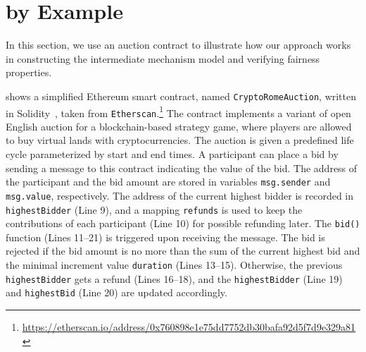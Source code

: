 \section{\faircon by Example}\label{Sec_MotivatingExample}


In this section, we use an auction contract to illustrate how our approach works in
constructing the intermediate mechanism model and verifying fairness properties.

\begin{example}\label{exp:cryptorome}
	 shows a simplified Ethereum smart contract,
	named \texttt{CryptoRomeAuction}, written in Solidity~\cite{solidity}, taken from
	\texttt{Etherscan}.\footnote{\url{https://etherscan.io/address/0x760898e1e75dd7752db30bafa92d5f7d9e329a81}}
	The contract implements a variant of open English auction for a blockchain-based strategy game,
	where players are allowed to buy virtual lands with cryptocurrencies.
	The auction is given a predefined life cycle parameterized by start and end times.
	A participant can place a bid by sending a message to this contract indicating the value of the bid.
	The address of the participant and the bid amount are stored in variables \texttt{msg.sender} and
	\texttt{msg.value}, respectively.
	The address of the current highest bidder is recorded in \texttt{highestBidder} (Line 9), and a
	mapping \texttt{refunds} is used to keep the contributions of each participant (Line 10) for
	possible refunding later.
	The \texttt{bid()} function (Lines 11--21) is triggered upon receiving the message.
	The bid is rejected if the bid amount is no more than the sum of the current highest bid
	and the minimal increment value \texttt{duration} (Lines 13--15).
	Otherwise, the previous \texttt{highestBidder} gets a refund (Lines 16--18), and the
	\texttt{highestBidder} (Line 19) and \texttt{highestBid} (Line 20) are updated accordingly.
\end{example}

